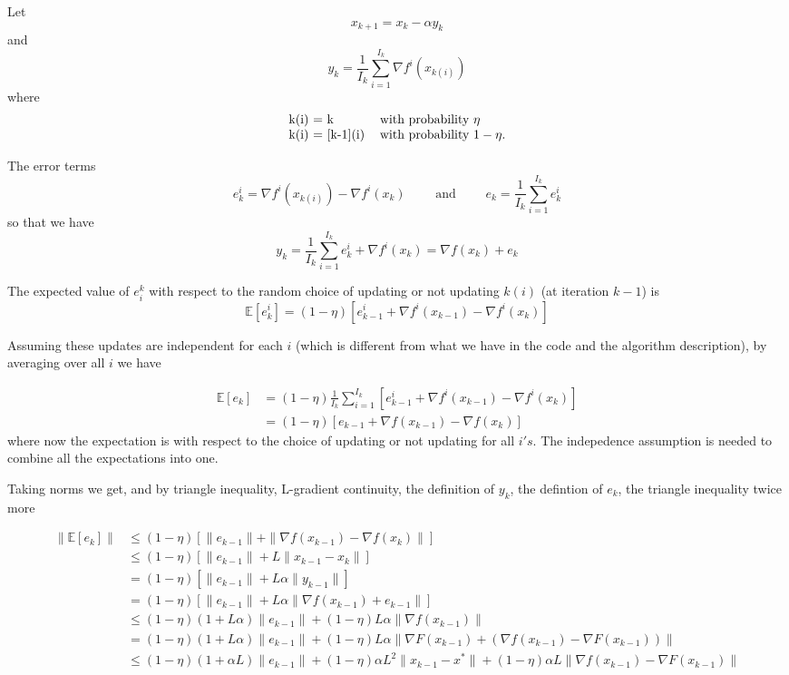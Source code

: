 \documentclass[11pt]{article}
\begin{document}
	Let 
	\[
	x_{k+1} = x_k - \alpha y_k
	\]
	and
	\[
	y_k = \frac{1}{I_k}  \sum_{i=1}^{I_k} \nabla f^i (x_{k(i)})
	\]
	where
	\[
		\begin{tabular}{ll}
			k(i) = k  & \mbox{with probability $\eta$} \\
			k(i) = [k-1](i) & \mbox{with probability $1-\eta$.}\\
		\end{tabular}
	\]
		
	The error terms
	\[
	e_k^i = \nabla f^i (x_{k(i)}) - \nabla f^i (x_k) \qquad \mbox{ and } \qquad e_k =  \frac{1}{I_k}  \sum_{i=1}^{I_k} e_k^i
	\]
	so that we have 
	\[
	y_k = \frac{1}{I_k}  \sum_{i=1}^{I_k} e_k^i +  \nabla f^i (x_k)  = \nabla f(x_k) + e_k
	\]
		
   The expected value of $e_i^k$ with respect to the random choice of updating or not updating $k(i)$ (at iteration $k-1$) is 
   \[
      \mathbb{E}[e_k^i] = (1-\eta) [ e_{k-1}^i + \nabla f^i(x_{k-1}) - \nabla f^i(x_{k}) ] 
   \]
   
   Assuming these updates are independent for each $i$ (which is different from what we have in the code and the algorithm description), by averaging over all $i$ we have

   \begin{align*}
      \mathbb{E}[e_k] &= (1-\eta) \frac{1}{I_k}  \sum_{i=1}^{I_k}[ e_{k-1}^i+ \nabla f^i(x_{k-1}) -  \nabla f^i(x_{k}) ] \\
	  & = (1-\eta) [ e_{k-1} + \nabla f(x_{k-1}) -  \nabla f(x_{k}) ] 
   \end{align*}
   where now the expectation is with respect to the choice of updating or not updating for all $i's$. The indepedence assumption is needed to combine all the expectations into one.
   
   Taking norms we get, and by triangle inequality, L-gradient continuity, the definition of $y_k$, the defintion of $e_k$, the triangle inequality twice more
   
	
	\begin{align*}
		\| \mathbb{E}[e_k] \| & \leq  (1-\eta) [ \| e_{k-1}\| + \|\nabla f(x_{k-1}) -  \nabla f(x_{k})\| ] \\ 
		 &\leq (1-\eta) [ \| e_{k-1} \|+ L \|x_{k-1} - x_k\| ] \\ 
		 &= (1-\eta) [ \| e_{k-1} \|+ L \alpha\| y_{k-1} \| ] \\ 
		 &= (1-\eta) [ \| e_{k-1} \|+ L \alpha\| \nabla f(x_{k-1}) + e_{k-1} \| ] \\ 
		 &\leq (1-\eta)(1+L \alpha)  \| e_{k-1} \|+ (1-\eta) L \alpha\| \nabla f(x_{k-1}) \|  \\ 
		  &=  (1-\eta)(1+L \alpha)  \| e_{k-1} \|+ (1-\eta) L \alpha\| \nabla F(x_{k-1}) + (\nabla f(x_{k-1}) - \nabla F(x_{k-1})) \|  \\ 
		& \leq (1-\eta)(1+\alpha L)\|e_{k-1}\| + (1-\eta)\alpha L^2 \|x_{k-1} - x^*\| + (1- \eta)\alpha L \| \nabla f(x_{k-1}) - \nabla F (x_{k-1})\|
	\end{align*}
	
\end{document}
